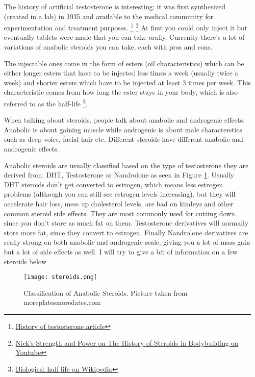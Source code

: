 \documentclass[openany, 12pt]{book}
\begin{document}
        The history of artificial testosterone is interesting: it was first synthesized (created in a lab) in 1935 and available to the medical community for experimentation and
        treatment purposes.
        \footnote{\href{http://denverhormonehealth.com/history-of-testosterone-new/}{History of testosterone article}}
        \footnote{\href{https://www.youtube.com/watch?v=C88Cn9e1UGM}{Nick's Strength and Power on The History of Steroids in Bodybuilding on Youtube}}
        At first you could only inject it but eventually tablets were made that you can take orally. Currently there's a lot of variations of anabolic steroids you can take, each with pros and cons.

        The injectable ones come in the form of esters (oil characteristics) which can be either longer esters that have to be injected less times a week (usually twice a week) and shorter esters which have
        to be injected at least 3 times per week. This characteristic comes from how long the ester stays in your body, which is also referred to as the half-life
        \footnote{\href{https://en.wikipedia.org/wiki/Biological_half-life}{Biological half life on Wikipedia}}.
        
        When talking about steroids, people talk about anabolic and androgenic effects. Anabolic is about gaining muscle while androgenic is about male characterstics such as deep voice, facial hair etc.
        Different steroids have different anabolic and androgenic effects.

        Anabolic steroids are usually classified based on the type of testosterone they are derived from: DHT, Testosterone or Nandrolone as seen in Figure \ref{fig8}.
        Usually DHT steroids don't get converted to estrogen, which means less estrogen problems (although you can still see estrogen levels increasing), but they will accelerate hair loss,
        mess up cholesterol levels, are bad on kindeys and other common steroid side effects. They are most commonly used for cutting down since you don't store as much fat on them.
        Testosterone derivatives will normally store more fat, since they convert to estrogen. Finally Nandrolone derivatives are really strong on both anabolic and androgenic scale, giving you a lot of
        mass gain but a lot of side effects as well.
        I will try to give a bit of information on a few steroids below

	\begin{figure}[h]
		\centering
		\texttt{[image: steroids.png]}
		\caption{Classification of Anabolic Steroids. Picture taken from moreplatesmoredates.com}
		\label{fig8}
	\end{figure}
\end{document}
